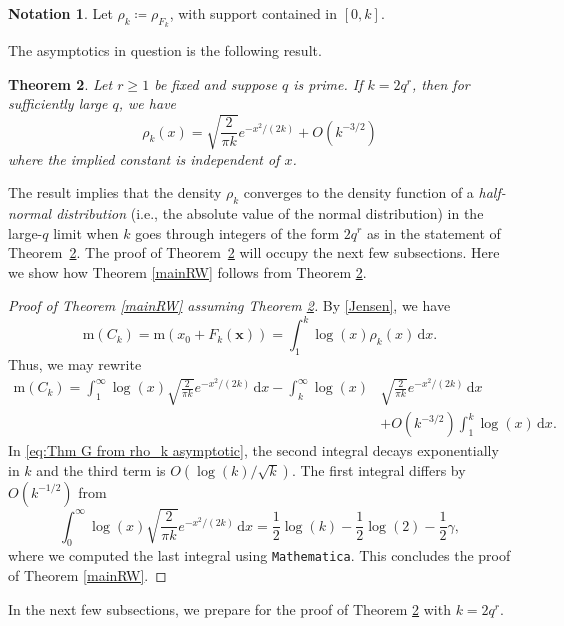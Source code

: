 \documentclass[12pt,reqno]{amsart}
\theoremstyle{definition}
\theoremstyle{plain}
\newtheorem{theorem}{Theorem}[subsection]
\theoremstyle{definition}
\newtheorem{notation}[theorem]{Notation}
\newcommand\m{\mathrm{m}}
\renewcommand{\geq}{\geqslant}
\renewcommand{\d}{\mathrm{d}}
\begin{document}
\begin{notation} 
Let $\rho_k \coloneqq  \rho_{F_k}$, with support contained in  $[0,k]$.
\end{notation} 

The asymptotics in question is the following result. 
\begin{theorem}
\label{MainTHM6}
Let $r \geq 1$ be fixed and suppose $q$ is prime. If $k = 2q^r$, then for sufficiently large $q$, we have
\[
\rho_k(x) = \sqrt{\frac{2}{\pi k}} e^{-x^2/(2 k)} + O(k^{-3/2})
\]
where the implied constant is independent of $x$.
\end{theorem}

The result implies that the density $\rho_k$ converges to the density function of a \emph{half-normal distribution} (i.e., the absolute value of the normal distribution) in the large-$q$ limit when $k$ goes through integers of the form $2q^r$ as in the statement of Theorem~\ref{MainTHM6}. The proof of Theorem~\ref{MainTHM6} will occupy the next few subsections. Here we show how Theorem \ref{mainRW} follows from Theorem \ref{MainTHM6}.
\begin{proof}[Proof of Theorem \ref{mainRW} assuming Theorem \ref{MainTHM6}]

 By \eqref{Jensen}, we have 
 \begin{equation}
\label{JensenCk}
\m(C_k) = \m(x_0 + F_{k}(\mathbf x)) = \int_{1}^{k} \log(x) \rho_{k}(x) \, \d x.    
\end{equation}
Thus, we may rewrite 
\begin{align}
\label{eq:Thm G from rho_k asymptotic}
\m(C_k) = \int_{1}^{\infty} \log(x) \sqrt{\frac{2}{\pi k}} e^{-x^2/(2 k)}  \, \d x - \int_{k}^{\infty} \log(x) & \sqrt{\frac{2}{\pi k}} e^{-x^2/(2 k)}  \, \d x \nonumber \\ &+ O(k^{-3/2}) \int_{1}^{k} \log(x) \, \d x.
\end{align}
In \eqref{eq:Thm G from rho_k asymptotic}, the second integral decays exponentially in $k$ and the third term is $O(\log(k)/\sqrt{k})$. The first integral differs by $O(k^{-1/2})$ from
\begin{equation*}
\int_{0}^{\infty} \log(x) \sqrt{\frac{2}{\pi k}} e^{-x^2/(2 k)}  \, \d x  =  \frac{1}{2}\log(k) - \frac{1}{2}\log(2) - \frac{1}{2}\gamma,
\end{equation*}
where we computed the last integral using \texttt{Mathematica}. This concludes the proof of Theorem \ref{mainRW}.
\end{proof}

In the next few subsections, we prepare for the proof of Theorem \ref{MainTHM6} with $k=2q^r$. 
\end{document}

